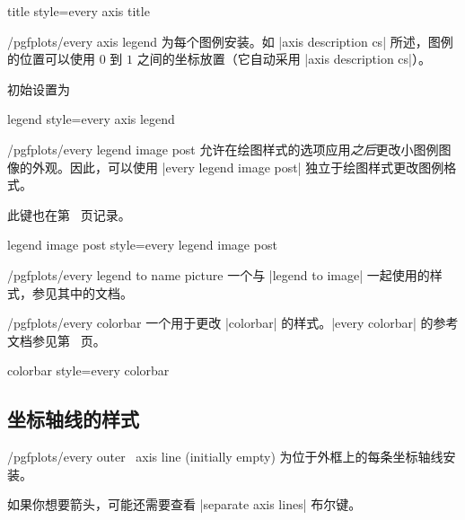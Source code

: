 \pgfplotsshortstylekey title style=every axis title\pgfeov

\begin{stylekey}{/pgfplots/every axis legend}
    为每个图例安装。如 |axis description cs| 所述，图例的位置可以使用 $0$ 到 $1$ 之间的坐标放置（它自动采用 |axis description cs|）。

    初始设置为
\begin{codeexample}
\end{codeexample}
\end{stylekey}

\pgfplotsshortstylekey legend style=every axis legend\pgfeov

\begin{stylekey}{/pgfplots/every legend image post}
    允许在绘图样式的选项应用\emph{之后}更改小图例图像的外观。因此，可以使用 |every legend image post| 独立于绘图样式更改图例格式。

    此键也在第~\pageref{key:legendimagepost} 页记录。
\end{stylekey}

\pgfplotsshortstylekey legend image post style=every legend image post\pgfeov

\begin{stylekey}{/pgfplots/every legend to name picture}
    一个与 |legend to image| 一起使用的样式，参见其中的文档。
\end{stylekey}

\begin{stylekey}{/pgfplots/every colorbar}
    一个用于更改 |colorbar| 的样式。|every colorbar| 的参考文档参见第~\pageref{key:every:colorbar} 页。
\end{stylekey}

\pgfplotsshortstylekey colorbar style=every colorbar\pgfeov

\subsection*{坐标轴线的样式}
\begin{xystylekey}{/pgfplots/every outer \x\ axis line (initially empty)}
    为位于外框上的每条坐标轴线安装。

    如果你想要箭头，可能还需要查看 |separate axis lines| 布尔键。
\end{xystylekey}

